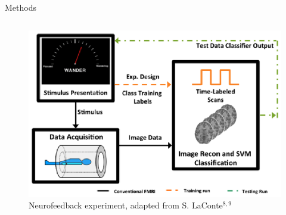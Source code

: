 \documentclass[final,hyperref={pdfpagelabels=false}]{beamer}
\begin{document}
\begin{frame}
\begin{columns}
\begin{column}{.5\textwidth}
{\begin{block}{Methods}
                \begin{column}{.47\textwidth}
                    \begin{figure}
                        \begin{center}
                            \includegraphics[width=.9\textwidth]{neurofeedback.eps}
                        \end{center}
                        \caption{\label{fig:roi_metrics}Neurofeedback experiment, adapted from S. LaConte$^{8,9}$}
                    \end{figure}
                \end{column}
\end{block}}
\end{column}
\end{columns}
\end{frame}
\end{document}
